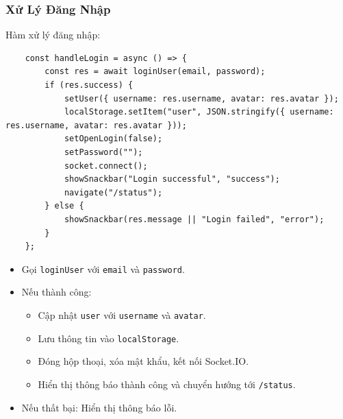             \subsubsection{Xử Lý Đăng Nhập}
                \hspace*{0.6cm}Hàm xử lý đăng nhập:
                \begin{lstlisting}
    const handleLogin = async () => {
        const res = await loginUser(email, password);
        if (res.success) {
            setUser({ username: res.username, avatar: res.avatar });
            localStorage.setItem("user", JSON.stringify({ username: res.username, avatar: res.avatar }));
            setOpenLogin(false);
            setPassword("");
            socket.connect();
            showSnackbar("Login successful", "success");
            navigate("/status");
        } else {
            showSnackbar(res.message || "Login failed", "error");
        }
    };
                \end{lstlisting}
                \begin{itemize}
                    \item Gọi \texttt{loginUser} với \texttt{email} và \texttt{password}.
                    \item Nếu thành công:
                    \begin{itemize}
                        \item Cập nhật \texttt{user} với \texttt{username} và \texttt{avatar}.
                        \item Lưu thông tin vào \texttt{localStorage}.
                        \item Đóng hộp thoại, xóa mật khẩu, kết nối Socket.IO.
                        \item Hiển thị thông báo thành công và chuyển hướng tới \texttt{/status}.
                    \end{itemize}
                    \item Nếu thất bại: Hiển thị thông báo lỗi.
                \end{itemize}

